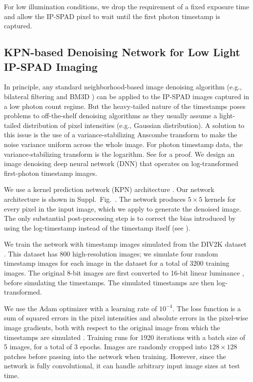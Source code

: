 For low illumination conditions, we drop the requirement of a fixed exposure
time and allow the IP-SPAD pixel to wait until the first photon timestamp
is captured.

\subsection{KPN-based Denoising Network for Low Light IP-SPAD Imaging}
In principle, any standard neighborhood-based image denoising algorithm (e.g.,
bilateral filtering \cite{paris2007gentle} and BM3D \cite{dabov2007image}) can
be applied to the IP-SPAD images captured in a low photon count regime. But the
heavy-tailed nature of the timestamps poses problems to off-the-shelf denoising
algorithms as they usually assume a light-tailed distribution of pixel
intensities (e.g., Gaussian distribution). A solution to this issue is the use
of a variance-stabilizing Anscombe transform
\cite{anscombe_transformation_1948} to make the noise variance uniform across
the whole image. For photon timestamp data, the variance-stabilizing transform
is the logarithm. See \nolink{\ref{sec:suppl_note_logT_estimator}} for a proof.
We design an image denoising deep neural network (DNN) that operates on
log-transformed first-photon timestamp images.

We use a kernel prediction network (KPN) architecture 
\cite{kpn_2017,burstkpn_2018}. Our network architecture is shown in
Suppl.~Fig.~\nolink{\ref{fig:kpn_logtimg}}. The network produces $5 \times 5$
kernels for every pixel in the input image, which we apply to generate the
denoised image. The only substantial post-processing step is to correct the
bias introduced by using the log-timestamp instead of the timestamp itself (see
\nolink{\ref{sec:suppl_note_logT_estimator}}).

We train the network with timestamp images simulated from the DIV2K dataset
\cite{DIV2K_Intro,DIV2K_Report}. This dataset has 800 high-resolution images;
we simulate four random timestamp images for each image in the dataset for a
total of 3200 training images. The original 8-bit images are first converted to
16-bit linear luminance \cite{imagemagick}, before simulating the timestamps.
The simulated timestamps are then log-transformed.

We use the Adam optimizer \cite{kingma2017adam} with a learning rate of
$10^{-4}$. The loss function is a sum of squared errors in the pixel
intensities and absolute errors in the pixel-wise image gradients, both with
respect to the original image from which the timestamps are simulated
\cite{burstkpn_2018}.  Training runs for 1920 iterations with a batch size of 5
images, for a total of 3 epochs. Images are randomly cropped into $128 \times
128$ patches before passing into the network when training. However, since
the network is fully convolutional, it can handle arbitrary input image sizes
at test time.


